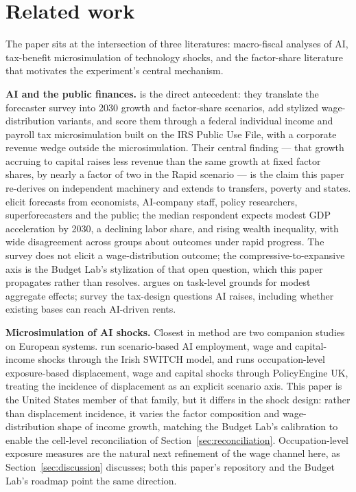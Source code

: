\section{Related work}\label{sec:literature}

The paper sits at the intersection of three literatures: macro-fiscal
analyses of AI, tax-benefit microsimulation of technology shocks, and the
factor-share literature that motivates the experiment's central mechanism.

\textbf{AI and the public finances.} \citet{iselinnunn2026} is the direct
antecedent: they translate the \citet{karger2026} forecaster survey into
2030 growth and factor-share scenarios, add stylized wage-distribution
variants, and score them through a federal individual income and payroll tax
microsimulation built on the IRS Public Use File, with a corporate revenue
wedge outside the microsimulation. Their central finding --- that growth
accruing to capital raises less revenue than the same growth at fixed factor
shares, by nearly a factor of two in the Rapid scenario --- is the claim
this paper re-derives on independent machinery and extends to transfers,
poverty and states. \citet{karger2026} elicit forecasts from economists,
AI-company staff, policy researchers, superforecasters and the public; the
median respondent expects modest GDP acceleration by 2030, a declining labor
share, and rising wealth inequality, with wide disagreement across groups
about outcomes under rapid progress. The survey does not elicit a
wage-distribution outcome; the compressive-to-expansive axis is the Budget
Lab's stylization of that open question, which this paper propagates rather
than resolves. \citet{acemoglu2025} argues on task-level grounds for modest
aggregate effects; \citet{bastani2024} survey the tax-design questions AI
raises, including whether existing bases can reach AI-driven rents.

\textbf{Microsimulation of AI shocks.} Closest in method are two companion
studies on European systems. \citet{doorley2026} run scenario-based AI
employment, wage and capital-income shocks through the Irish SWITCH model,
and
\citet{ahmadi2026} runs occupation-level exposure-based displacement, wage and
capital shocks through PolicyEngine UK, treating the incidence of
displacement as an explicit scenario axis. This paper is the United States
member of that family, but it differs in the shock design: rather than
displacement incidence, it varies the factor composition and
wage-distribution shape of income growth, matching the Budget Lab's
calibration to enable the cell-level reconciliation of
Section~\ref{sec:reconciliation}. Occupation-level exposure measures
\citep{felten2021, eloundou2024} are the natural next refinement of the wage
channel here, as Section~\ref{sec:discussion} discusses; both this paper's
repository and the Budget Lab's roadmap point the same direction.

